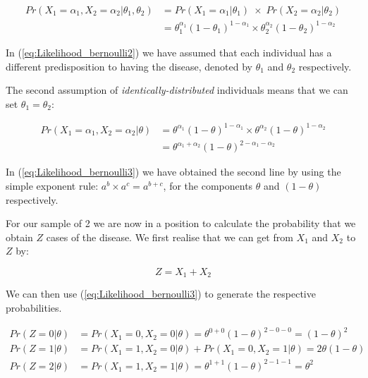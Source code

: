 \documentclass[11pt,fullpage]{book}
\begin{document}
\begin{equation}\label{eq:Likelihood_bernoulli2}
\begin{align}
Pr(X_1=\alpha_1,X_2=\alpha_2|\theta_1,\theta_2) &= Pr(X_1=\alpha_1|\theta_1)\;\times \;Pr(X_2=\alpha_2|\theta_2)\\
 &= \theta_1^{\alpha_1}(1-\theta_1)^{1-\alpha_1}\times \theta_2^{\alpha_2}(1-\theta_2)^{1-\alpha_2}
\end{align}
\end{equation}

In (\ref{eq:Likelihood_bernoulli2}) we have assumed that each individual has a different predisposition to having the disease, denoted by $\theta_1$ and $\theta_2$ respectively.

The second assumption of \textit{identically-distributed} individuals means that we can set $\theta_1=\theta_2$:

\begin{equation}\label{eq:Likelihood_bernoulli3}
\begin{align}
 Pr(X_1=\alpha_1,X_2=\alpha_2|\theta) &= \theta^{\alpha_1}(1-\theta)^{1-\alpha_1}\times \theta^{\alpha_2}(1-\theta)^{1-\alpha_2}\\
&= \theta^{\alpha_1+\alpha_2}(1-\theta)^{2-\alpha_1-\alpha_2}
\end{align}
\end{equation}

In (\ref{eq:Likelihood_bernoulli3}) we have obtained the second line by using the simple exponent rule: $a^b\times a^c = a^{b+c}$, for the components $\theta$ and $(1-\theta)$ respectively.

For our sample of 2 we are now in a position to calculate the probability that we obtain $Z$ cases of the disease. We first realise that we can get from $X_1$ and $X_2$ to $Z$ by:

\begin{equation}\label{eq:Likelihood_binomialTwo}
Z = X_1 + X_2
\end{equation}

We can then use (\ref{eq:Likelihood_bernoulli3}) to generate the respective probabilities.

\begin{equation}\label{eq:Likelihood_binomialTwoProbs}
\begin{align}
Pr(Z = 0|\theta)& = Pr(X_1=0,X_2=0|\theta) = \theta^{0+0}(1-\theta)^{2-0-0} = (1-\theta)^2\\
Pr(Z = 1|\theta)& = Pr(X_1=1,X_2=0|\theta) + Pr(X_1=0,X_2=1|\theta)= 2\theta(1-\theta)\\
Pr(Z = 2|\theta)& = Pr(X_1=1,X_2=1|\theta) = \theta^{1+1}(1-\theta)^{2-1-1} = \theta^2
\end{align}
\end{equation}
\end{document}
